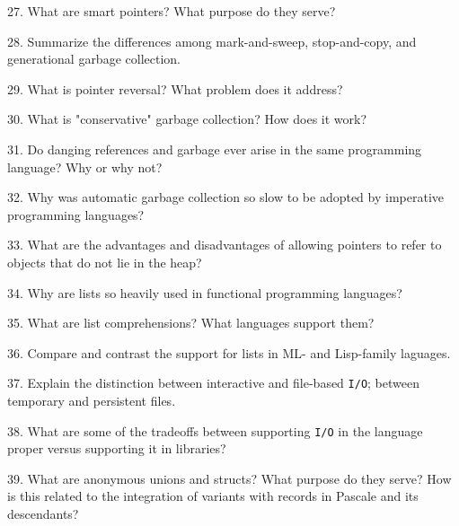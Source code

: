 \filbreak
\vskip 1cm

27. What are smart pointers? What purpose do they serve?

\filbreak
\vskip 1cm

28. Summarize the differences among mark-and-sweep, stop-and-copy, and generational garbage collection.

\filbreak
\vskip 1cm

29. What is pointer reversal? What problem does it address?

\filbreak
\vskip 1cm

30. What is "conservative" garbage collection? How does it work?

\filbreak
\vskip 1cm

31. Do danging references and garbage ever arise in the same programming language? Why or why not?

\filbreak
\vskip 1cm

32. Why was automatic garbage collection so slow to be adopted by imperative programming languages?

\filbreak
\vskip 1cm

33. What are the advantages and disadvantages of allowing pointers to refer to objects that do not lie in the heap?

\filbreak
\vskip 1cm

34. Why are lists so heavily used in functional programming languages?

\filbreak
\vskip 1cm

35. What are list comprehensions? What languages support them?

\filbreak
\vskip 1cm

36. Compare and contrast the support for lists in ML- and Lisp-family laguages.

\filbreak
\vskip 1cm

37. Explain the distinction between interactive and file-based {\tt I/O}; between temporary and persistent files.

\filbreak
\vskip 1cm

38. What are some of the tradeoffs between supporting {\tt I/O} in the language proper versus supporting it in libraries?

\filbreak
\vskip 1cm

39. What are anonymous unions and structs? What purpose do they serve? How is this related to the integration of variants with records in Pascale and its descendants?

\filbreak
\vskip 1cm

